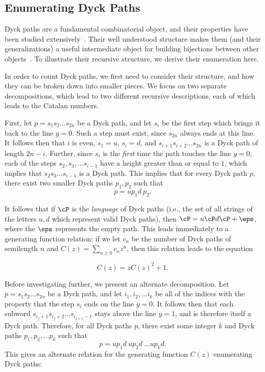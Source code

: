 \documentclass[12pt,twoside]{memoir}
\begin{document}
    \subsection{Enumerating Dyck Paths}
      
      
      Dyck paths are a fundamental combinatorial object, and their properties
      have been studied extensively~\cite{Chapman1999, Deutsch1999, Denise1995}. 
      Their well understood structure makes them (and their generalizations) a
      useful intermediate object for building bijections between other
      objects~\cite{Claesson2008, bloomvince}. To illustrate their recursive
      structure, we derive their enumeration here. 

      In order to count Dyck paths, we first need to consider their structure,
      and how they can be broken down into smaller pieces. We focus on two
      separate decompositions, which lead to two different recursive
      descriptions, each of which leads to the Catalan numbers. 

      First, let $p = s_1 s_2 \dots s_{2n}$ be a Dyck path, and let $s_i$ be the
      first step which brings it back to the line $y = 0$. Such a step must
      exist, since $s_{2n}$ always ends at this line. It follows
      then that $i$ is even, $s_1 = u$, $s_i = d$, and $s_{i+1} s_{i+2} \dots
      s_{2n}$ is a Dyck path of length $2n-i$. 
      Further, since $s_i$ is the \emph{first} time
      the path touches the line $y=0$, each of the steps $s_2, s_3, \dots
      s_{i-1}$ have a height greater than or equal to $1$, which implies that
      $s_2 s_3 \dots s_{i-1}$ is a Dyck path. This implies that for every Dyck
      path $p$, there exist two smaller Dyck paths $p_1, p_2$ such that $$ p = u
      p_1 d\ p_2 .$$

      It follows that if $\cP$ is the \emph{language} of Dyck paths (i.e., the
      set of all strings of the letters $u,d$ which represent valid Dyck paths),
      then $\cP = u \cP d \cP + \eps$, where the $\eps$ represents the empty
      path. This leads immediately to a generating function relation: if we let
      $c_n$ be the number of Dyck paths of semilength $n$ and $C(z) = \sum_{n\geq
      0} c_n z^n$, then this relation leads to the equation 

      \begin{equation}  \label{prelim:eqn:firstpass}   
        C(z) = z C(z)^2 + 1. 
      \end{equation}

      Before investigating further, we present an alternate decomposition. Let $p
      = s_1 s_2 \dots s_{2n}$ be a Dyck path, and let $i_1, i_2, \dots i_k$ be
      all of the indices with the property that the step $s_i$ ends on the line
      $y=0$. It follows then that each subword $s_{i_j + 1} s_{i_j + 2} \dots
      s_{i_{j+1} -1}$ stays above the line $y=1$, and is therefore itself a Dyck
      path. Therefore, for all Dyck paths $p$, there exist some integer $k$ and
      Dyck paths $p_1, p_2, \dots p_k$ such that 
      $$ p = u p_1 d\  u p_2 d\  \dots u p_k d.$$
      This gives an alternate relation for the generating function $C(z)$
      enumerating Dyck paths:
      
\end{document}

